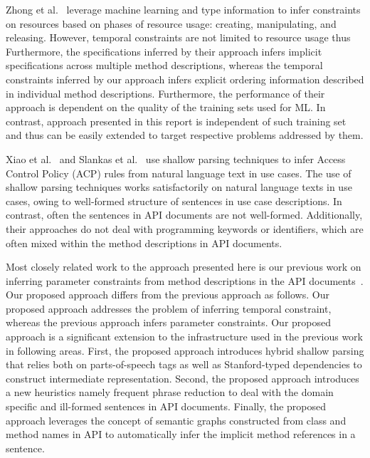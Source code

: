 Zhong et al.~\cite{zhong09SE} leverage machine learning and type information to infer constraints on resources based on phases of resource usage: creating, manipulating, and releasing.
However, temporal constraints are not limited to resource usage thus 
Furthermore, the specifications inferred by their approach infers implicit specifications across multiple method descriptions,
whereas the temporal constraints inferred by our approach infers explicit ordering information described in individual method descriptions.
Furthermore, the performance of their approach is dependent on the quality of the training sets used for ML.
In contrast, approach presented in this report is independent of such training set and thus can be easily extended to target respective problems addressed by them.

Xiao et al.~\cite{XiaoFSE2012} and Slankas et al.~\cite{johnSlankasPASSAT13} use shallow parsing techniques to infer Access Control Policy (ACP) rules from natural language text in use cases.
The use of shallow parsing techniques works satisfactorily on natural language texts in use cases, owing to well-formed structure of sentences in use case descriptions.
In contrast, often the sentences in API documents are not well-formed.
Additionally, their approaches do not deal with programming keywords or identifiers, which are often mixed within the method descriptions in API documents.

Most closely related work to the approach presented here is our previous work on inferring parameter constraints from method descriptions in the API documents~\cite{pandita12:inferring}.
Our proposed approach differs from the previous approach as follows.
Our proposed approach addresses the problem of inferring temporal constraint, whereas the previous approach infers parameter constraints.
Our proposed approach is a significant extension to the infrastructure used in the previous work in following areas.
First, the proposed approach introduces hybrid shallow parsing that relies both on parts-of-speech tags as well as Stanford-typed dependencies to construct intermediate representation.
Second, the proposed approach introduces a new heuristics namely frequent phrase reduction to deal with the domain specific and ill-formed sentences in API documents.
Finally, the proposed approach leverages the concept of semantic graphs constructed from class and method names in API to automatically infer the implicit method references in a sentence.   


